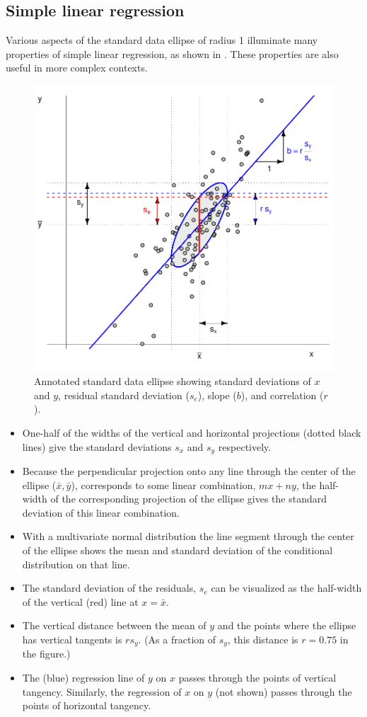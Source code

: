 \subsection{Simple linear regression}

Various aspects of the standard data ellipse of radius 1 illuminate many properties
of simple linear regression, as shown in .
These properties are also useful in more complex contexts.

\begin{figure}[htb]
  \centering
  \includegraphics[width=.6\textwidth,clip]{fig/ellipses-demo}
  \caption{Annotated standard data ellipse showing standard deviations of $x$ and $y$, residual
  standard deviation ($s_e$), slope ($b$), and correlation ($r$).
  }%
  \label{fig:ellipses-demo}
\end{figure}

\begin{itemize}
  \item One-half of the widths of the vertical and horizontal projections (dotted black lines)
  give the standard deviations $s_x$ and $s_y$ respectively.
  \item Because the perpendicular projection onto any line through the center of the ellipse ($\bar{x}, \bar{y}$), corresponds to
  some linear combination, $m x + n y$, the half-width of the corresponding projection of the ellipse
  gives the standard deviation of this linear combination.
  \item With a multivariate normal distribution the line segment through the center of the ellipse
  shows the mean and standard deviation of the conditional distribution on that line.
  \item The standard deviation of the residuals, $s_e$ can be visualized as the half-width of the vertical
  (red) line at $x=\bar{x}$.
  \item The vertical distance between the mean of $y$ and the points where the ellipse has vertical
  tangents is $r s_y$. (As a fraction of $s_y$, this distance is $r = 0.75$ in the figure.)
  \item The (blue) regression line of $y$ on $x$ passes through the points of vertical tangency.
  Similarly, the regression of $x$ on $y$ (not shown) passes through the points of
  horizontal tangency.

\end{itemize}


